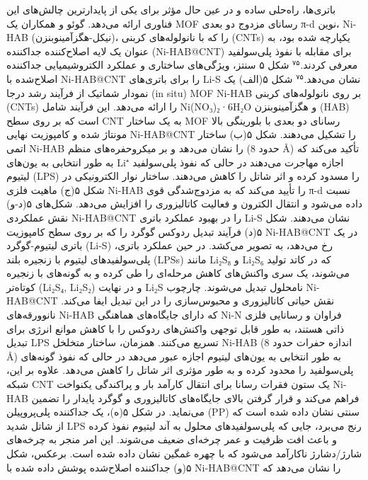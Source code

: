\documentclass[12pt,a4paper,twocolumn]{article} %
\newcommand{\persian}[1]{\textfarsi{#1}}
\newcommand{\english}[1]{\textenglish{#1}}
\begin{document}

\persian{
باتری‌ها، راه‌حلی ساده و در عین حال مؤثر برای یکی از پایدارترین چالش‌های این فناوری ارائه می‌دهد. گوئو و همکاران یک \english{MOF} رسانای مزدوج دو بعدی \english{π-d} نوین، \english{Ni-HAB} (نیکل-هگزآمینوبنزن)، را که با نانولوله‌های کربنی (\english{CNTs}) یکپارچه شده بود، به عنوان یک لایه اصلاح‌کننده جداکننده (\english{Ni-HAB@CNT}) برای مقابله با نفوذ پلی‌سولفید معرفی کردند.$^{۷۵}$ شکل ۵ سنتز، ویژگی‌های ساختاری و عملکرد الکتروشیمیایی جداکننده اصلاح‌شده با \english{Ni-HAB@CNT} را برای باتری‌های \english{Li-S} نشان می‌دهد.$^{۷۵}$ شکل ۵(الف) یک نمودار شماتیک از فرآیند رشد درجا (\english{in situ}) \english{MOF} \english{Ni-HAB} بر روی نانولوله‌های کربنی (\english{CNTs}) را ارائه می‌دهد. این فرآیند شامل \english{Ni(NO₃)₂·6H₂O} و هگزآمینوبنزن (\english{HAB}) است که بر روی سطح \english{CNT} به یک ساختار \english{MOF} رسانای دو بعدی با بلورینگی بالا مونتاژ شده و کامپوزیت نهایی \english{Ni-HAB@CNT} را تشکیل می‌دهند. شکل ۵(ب) ساختار اتمی \english{Ni-HAB} را نشان می‌دهد و بر میکروحفره‌های منظم (حدود \english{8 Å}) تأکید می‌کند که به طور انتخابی به یون‌های \english{Li⁺} اجازه مهاجرت می‌دهند در حالی که نفوذ پلی‌سولفید لیتیوم (\english{LPS}) را مسدود کرده و اثر شاتل را کاهش می‌دهند. ساختار نوار الکترونیکی در شکل ۵(ج) ماهیت فلزی \english{Ni-HAB} را تأیید می‌کند که به مزدوج‌شدگی قوی \english{π-d} نسبت داده می‌شود و انتقال الکترون و فعالیت کاتالیزوری را افزایش می‌دهد. شکل‌های ۵(د-و) نقش عملکردی \english{Ni-HAB@CNT} را در بهبود عملکرد باتری \english{Li-S} نشان می‌دهند. شکل ۵(د) فرآیند تبدیل ردوکس گوگرد را که بر روی سطح کامپوزیت \english{Ni-HAB@CNT} در یک باتری لیتیوم-گوگرد (\english{Li-S}) رخ می‌دهد، به تصویر می‌کشد. در حین عملکرد باتری، پلی‌سولفیدهای لیتیوم با زنجیره بلند (\english{LPSs}) مانند \english{Li₂S₈} و \english{Li₂S₆} که در کاتد تولید می‌شوند، یک سری واکنش‌های کاهش مرحله‌ای را طی کرده و به گونه‌های با زنجیره کوتاه‌تر (\english{Li₂S₄, Li₂S₂}) و در نهایت \english{Li₂S} نامحلول تبدیل می‌شوند. چارچوب \english{Ni-HAB@CNT} نقش حیاتی کاتالیزوری و محبوس‌سازی را در این تبدیل ایفا می‌کند. نانوورقه‌های \english{Ni-HAB} که دارای جایگاه‌های هماهنگی \english{Ni-N} فراوان و رسانایی فلزی ذاتی هستند، به طور قابل توجهی واکنش‌های ردوکس را با کاهش موانع انرژی برای تبدیل \english{LPS} تسریع می‌کنند. همزمان، ساختار متخلخل \english{Ni-HAB} (اندازه حفرات حدود \english{8 Å}) به طور انتخابی به یون‌های لیتیوم اجازه عبور می‌دهد در حالی که نفوذ گونه‌های پلی‌سولفید را محدود کرده و به طور مؤثری اثر شاتل را کاهش می‌دهد. علاوه بر این، شبکه \english{CNT} یک ستون فقرات رسانا برای انتقال کارآمد بار و پراکندگی یکنواخت \english{Ni-HAB} فراهم می‌کند و قرار گرفتن بالای جایگاه‌های کاتالیزوری و گوگرد پایدار را تضمین می‌نماید. در شکل ۵(ه)، یک جداکننده پلی‌پروپیلن (\english{PP}) سنتی نشان داده شده است که از شاتل شدید \english{LPS} رنج می‌برد، جایی که پلی‌سولفیدهای محلول به آند لیتیوم نفوذ کرده و باعث افت ظرفیت و عمر چرخه‌ای ضعیف می‌شوند. این امر منجر به چرخه‌های شارژ/دشارژ ناکارآمد می‌شود که با چهره غمگین نشان داده شده است. برعکس، شکل ۵(و) جداکننده اصلاح‌شده پوشش داده شده با \english{Ni-HAB@CNT} را نشان می‌دهد که }
\end{document}
